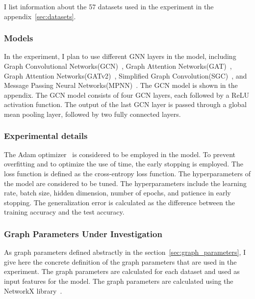 \documentclass{article}
\begin{document}
I list information about the 57 datasets used in the experiment in the appendix~\ref{sec:datasets}.

\subsubsection{Models}
In the experiment, I plan to use different GNN layers in the model, including Graph Convolutional Networks(GCN)~\cite{kipf2016semi}, Graph Attention Networks(GAT)~\cite{velickovic2020pointer}, Graph Attention Networks(GATv2)~\cite{brody2021attentive}, Simplified Graph Convolution(SGC)~\cite{wu2019simplifying}, and Message Passing Neural Networks(MPNN)~\cite{gilmer2017neural}. The GCN model is shown in the appendix. The GCN model consists of four GCN layers, each followed by a ReLU activation function. The output of the last GCN layer is passed through a global mean pooling layer, followed by two fully connected layers.

\subsubsection{Experimental details}
The Adam optimizer~\cite{kingma2014adam} is considered to be employed in the model. To prevent overfitting and to optimize the use of time, the early stopping is employed. The loss function is defined as the cross-entropy loss function. The hyperparameters of the model are considered to be tuned. The hyperparameters include the learning rate, batch size, hidden dimension, number of epochs, and patience in early stopping. The generalization error is calculated as the difference between the training accuracy and the test accuracy.

\subsubsection{Graph Parameters Under Investigation}
As graph parameters defined abstractly in the section~\ref{sec:graph_parameters}, I give here the concrete definition of the graph parameters that are used in the experiment. The graph parameters are calculated for each dataset and used as input features for the model. The graph parameters are calculated using the NetworkX library~\cite{hagberg2008exploring}.
\end{document}
